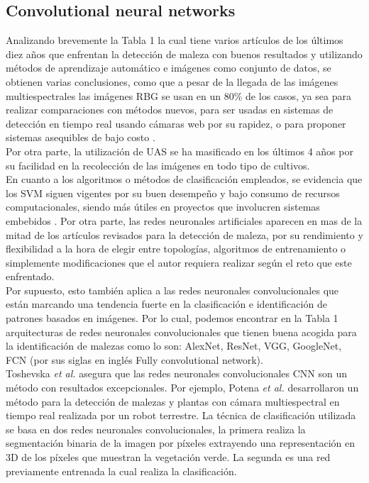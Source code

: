 \documentclass[journal,article,submit,moreauthors,pdftex]{Definitions/mdpi}
\begin{document}
\subsection{Convolutional neural networks}
Analizando brevemente la Tabla 1 la cual tiene varios artículos de los últimos diez años que enfrentan la detección de maleza con buenos resultados y utilizando métodos de aprendizaje automático e imágenes como conjunto de datos, se obtienen varias conclusiones, como que a pesar de la llegada de las imágenes multiespectrales las imágenes RBG se usan en un 80\% de los casos, ya sea para realizar comparaciones con métodos nuevos, para ser usadas en sistemas de detección en tiempo real usando cámaras web por su rapidez, o para proponer sistemas asequibles de bajo costo \cite{c15} \cite{c28} \cite{c29} \cite{c25}.
\\
Por otra parte, la utilización de UAS se ha masificado en los últimos 4 años por su facilidad en la recolección de las imágenes en todo tipo de cultivos. 
\\
En cuanto a los algoritmos o métodos de clasificación empleados, se evidencia que los SVM siguen vigentes por su buen desempeño y bajo consumo de recursos computacionales, siendo más útiles en proyectos que involucren sistemas embebidos \cite{c4} \cite{c10} \cite{c21}. Por otra parte, las redes neuronales artificiales aparecen en mas de la mitad de los artículos revisados para la detección de maleza, por su rendimiento y flexibilidad a la hora de elegir entre topologías, algoritmos de entrenamiento o simplemente modificaciones que el autor requiera realizar según el reto que este enfrentado.
\\
Por supuesto, esto también aplica a las redes neuronales convolucionales que están marcando una tendencia fuerte en la clasificación e identificación de patrones basados en imágenes. Por lo cual, podemos encontrar en la Tabla 1 arquitecturas de redes neuronales convolucionales que tienen buena acogida para la identificación de malezas como lo son: AlexNet, ResNet, VGG, GoogleNet, FCN (por sus siglas en inglés Fully convolutional network).
\\
Toshevska \textit{et al.} \cite{c47} asegura que las redes neuronales convolucionales CNN son un método con resultados excepcionales. Por ejemplo, Potena \textit{et al.} \cite{c17} desarrollaron un método para la detección de malezas y plantas con cámara multiespectral en tiempo real realizada por un robot terrestre. La técnica de clasificación utilizada se basa en dos redes neuronales convolucionales, la primera realiza la segmentación binaria de la imagen por píxeles extrayendo una representación en 3D de los píxeles que muestran la vegetación verde. La segunda es una red previamente entrenada la cual realiza la clasificación. 
\end{document}
